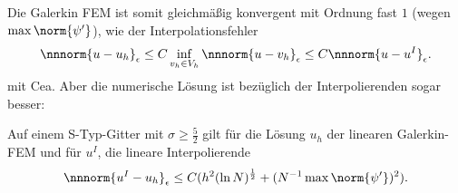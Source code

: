Die Galerkin FEM ist somit gleichmäßig konvergent mit Ordnung fast $1$ (wegen $\max \norm {\psi'}$), wie der Interpolationsfehler
\begin{align*}
  \nnnorm {u - u_{h}}_{\epsilon} \leq C \inf_{v_{h} \in V_{h}} \nnnorm{u - v_{h}}_{\epsilon} \leq C \nnnorm{u - u^{I}}_{\epsilon}. 
\end{align*}
mit Cea. Aber die numerische Lösung ist bezüglich der Interpolierenden sogar besser: 
\begin{satz}\label{thm:6-16}
  Auf einem S-Typ-Gitter mit $\sigma \geq \frac 52$ gilt für die Lösung $u_{h}$ der linearen Galerkin-FEM und für $u^{I}$, die lineare Interpolierende
  \begin{align*}
    \nnnorm{u^{I} - u_{h}}_{\epsilon} \leq C (h^{2} (\ln N)^{\frac 12} + (N^{-1} \max \norm{\psi'}) ^{2}). 
  \end{align*}
\end{satz}
